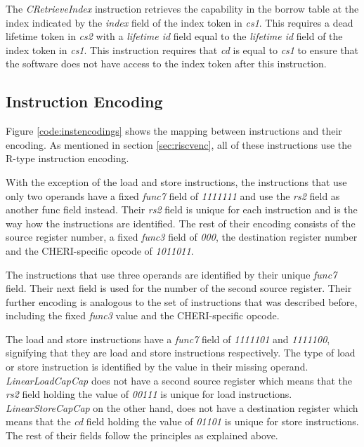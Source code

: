 The \textit{CRetrieveIndex} instruction retrieves the capability in the borrow table at the index indicated by the \textit{index} field of the index token in \textit{cs1}. This requires a dead lifetime token in \textit{cs2} with a \textit{lifetime id} field equal to the \textit{lifetime id} field of the index token in \textit{cs1}. This instruction requires that \textit{cd} is equal to \textit{cs1} to ensure that the software does not have access to the index token after this instruction.

\subsection{Instruction Encoding}
\label{sec:sailencoding}
Figure \ref{code:instencodings} shows the mapping between instructions and their encoding. As mentioned in section \ref{sec:riscvenc}, all of these instructions use the R-type instruction encoding.

With the exception of the load and store instructions, the instructions that use only two operands have a fixed \textit{func7} field of \textit{1111111} and use the \textit{rs2} field as another func field instead. Their \textit{rs2} field is unique for each instruction and is the way how the instructions are identified. The rest of their encoding consists of the source register number, a fixed \textit{func3} field of \textit{000}, the destination register number and the CHERI-specific opcode of \textit{1011011}.

The instructions that use three operands are identified by their unique \textit{func7} field. Their next field is used for the number of the second source register. Their further encoding is analogous to the set of instructions that was described before, including the fixed \textit{func3} value and the CHERI-specific opcode.

The load and store instructions have a \textit{func7} field of \textit{1111101} and \textit{1111100}, signifying that they are load and store instructions respectively. The type of load or store instruction is identified by the value in their missing operand. \textit{LinearLoadCapCap} does not have a second source register which means that the \textit{rs2} field holding the value of \textit{00111} is unique for load instructions. \textit{LinearStoreCapCap} on the other hand, does not have a destination register which means that the \textit{cd} field holding the value of \textit{01101} is unique for store instructions. The rest of their fields follow the principles as explained above.

